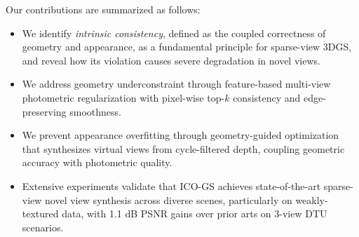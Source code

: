 Our contributions are summarized as follows:
\begin{itemize}[leftmargin=*,nosep]
      \item We identify \emph{intrinsic consistency}, defined as the coupled correctness 
      of geometry and appearance, as a fundamental principle for sparse-view 3DGS, 
      and reveal how its violation causes severe degradation in novel views.
    \item We address geometry underconstraint through feature-based multi-view 
          photometric regularization with pixel-wise top-$k$ consistency and 
          edge-preserving smoothness.
    \item We prevent appearance overfitting through geometry-guided optimization 
          that synthesizes virtual views from cycle-filtered depth, coupling 
          geometric accuracy with photometric quality.
    \item Extensive experiments validate that ICO-GS achieves state-of-the-art sparse-view novel view synthesis across diverse scenes, particularly on weakly-textured data, with 1.1 dB PSNR gains over prior arts on 3-view DTU scenarios.
\end{itemize}


